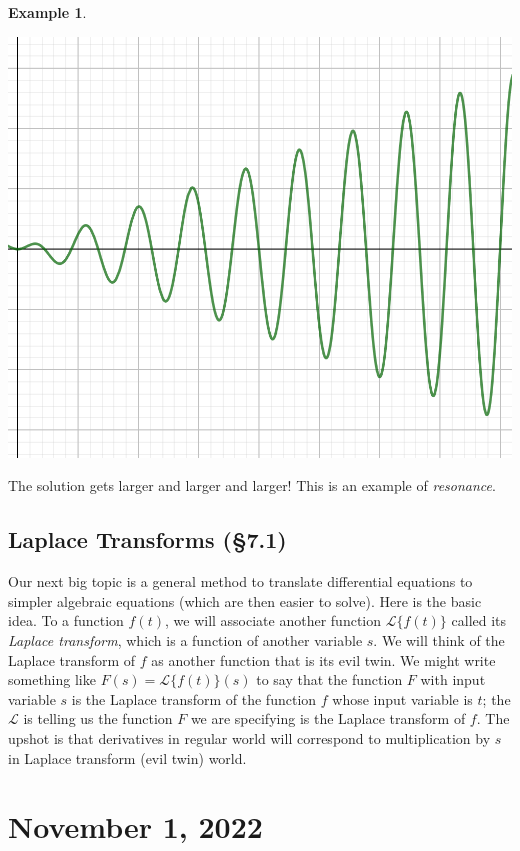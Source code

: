 \documentclass[12pt]{amsart}
\numberwithin{equation}{section}
\theoremstyle{plain} %
\newcommand{\Nov}[1]{\section{November #1, 2022}}
\theoremstyle{definition}
\newtheorem{ex}[equation]{Example}
\theoremstyle{remark}
\newcommand{\LA}[1]{\mathcal{L}\{ #1 \}}
\newcommand{\La}{\mathcal{L}}
\begin{document}
\begin{ex}
\begin{center}\includegraphics[scale=.5]{spring5}\end{center}

The solution gets larger and larger and larger!
This is an example of \emph{resonance}.
\end{ex}

\subsection*{Laplace Transforms (\S7.1)}

Our next big topic is a general method to translate differential equations to simpler algebraic equations (which are then easier to solve). Here is the basic idea. To a function $f(t)$, we will associate another function $\LA{f(t)}$ called its \emph{Laplace transform}, which is a function of another variable $s$. We will think of the Laplace transform of $f$ as another function that is its evil twin. We might write something like $F(s) = \LA{f(t)}(s)$ to say that the function $F$ with input variable $s$ is the Laplace transform of the function $f$ whose input variable is $t$; the $\La$ is telling us the function $F$ we are specifying is the Laplace transform of $f$. The upshot is that derivatives in regular world will correspond to multiplication by $s$ in Laplace transform (evil twin) world.



\Nov{1}
\end{document}
